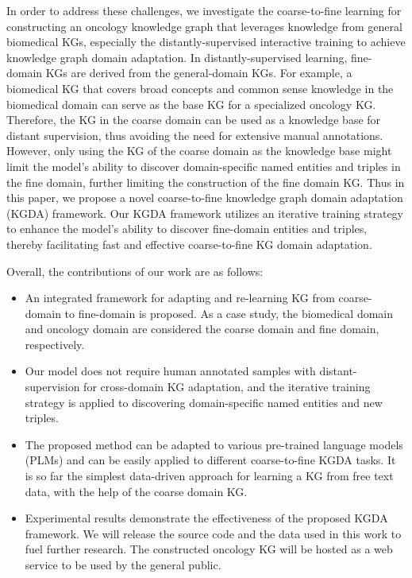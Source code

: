 \documentclass[sigconf]{acmart}
\begin{document}
In order to address these challenges, we investigate the coarse-to-fine learning for constructing an oncology knowledge graph that leverages knowledge from general biomedical KGs, especially the distantly-supervised interactive training to achieve knowledge graph domain adaptation. In distantly-supervised learning, fine-domain KGs are derived from the general-domain KGs. For example, a biomedical KG that covers broad concepts and common sense knowledge in the biomedical domain can serve as the base KG for a specialized oncology KG. Therefore, the KG in the coarse domain can be used as a knowledge base for distant supervision, thus avoiding the need for extensive manual annotations. However, only using the KG of the coarse domain as the knowledge base might limit the model's ability to discover domain-specific named entities and triples in the fine domain, further limiting the construction of the fine domain KG. Thus in this paper, we propose a novel coarse-to-fine knowledge graph domain adaptation (KGDA) framework. Our KGDA framework utilizes an iterative training strategy to enhance the model's ability to discover fine-domain entities and triples, thereby facilitating fast and effective coarse-to-fine KG domain adaptation. 

Overall, the contributions of our work are as follows:
\begin{itemize}
	\item An integrated framework for adapting and re-learning KG from coarse-domain to fine-domain is proposed. As a case study, the biomedical domain and oncology domain are considered the coarse domain and fine domain, respectively.
	\item Our model does not require human annotated samples with distant-supervision for cross-domain KG adaptation, and  the iterative training strategy is applied to discovering domain-specific named entities and new triples.
	\item The proposed method can be adapted to various pre-trained language models (PLMs) and can be easily applied to different coarse-to-fine KGDA tasks. It is so far the simplest data-driven approach for learning a KG from free text data, with the help of the coarse domain KG. 
	\item Experimental results demonstrate the effectiveness of the proposed KGDA framework. We will release the source code and the data used in this work to fuel further research. The constructed oncology KG will be hosted as a web service to be used by the general public.
	
\end{itemize}
\end{document}
